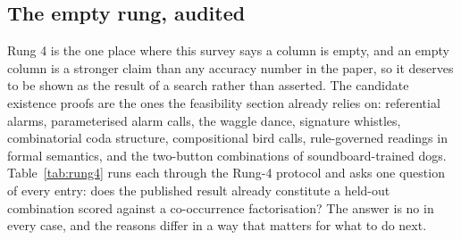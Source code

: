 \subsection{The empty rung, audited}

Rung 4 is the one place where this survey says a column is empty, and an
empty column is a stronger claim than any accuracy number in the paper, so it
deserves to be shown as the result of a search rather than asserted. The
candidate existence proofs are the ones the feasibility section already
relies on: referential alarms, parameterised alarm calls, the waggle dance,
signature whistles, combinatorial coda structure, compositional bird calls,
rule-governed readings in formal semantics, and the two-button combinations of
soundboard-trained dogs. Table~\ref{tab:rung4} runs each through the Rung-4
protocol and asks one question of every entry: does the published result
already constitute a held-out combination scored against a co-occurrence
factorisation? The answer is no in every case, and the reasons differ in a way
that matters for what to do next.


